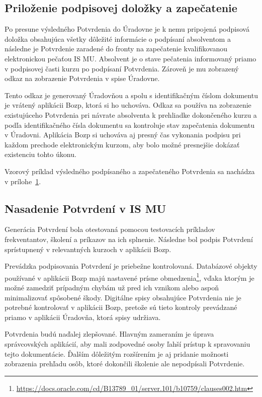 \documentclass[
  digital,     %
  oneside,     %
  nosansbold,  %
  nocolorbold, %
  lof,         %
  nolot,         %
]{fithesis4}
\begin{document}
\subsection*{Priloženie podpisovej doložky a zapečatenie}
Po presune výsledného Potvrdenia do Úradovne je k nemu pripojená podpisová doložka obsahujúca všetky dôležité informácie o podpísaní absolventom a následne je Potvrdenie zaradené do fronty na zapečatenie kvalifikovanou elektronickou pečaťou IS MU. Absolvent je o stave pečatenia informovaný priamo v podpisovej časti kurzu po podpísaní Potvrdenia. Zároveň je mu zobrazený odkaz na zobrazenie Potvrdenia v spise Úradovne.

Tento odkaz je generovaný Úradovňou a spolu s identifikačným číslom dokumentu je vrátený aplikácii Bozp, ktorá si ho uchováva. Odkaz sa používa na zobrazenie existujúceho Potvrdenia pri návrate absolventa k prehliadke dokončeného kurzu a podľa identifikačného čísla dokumentu sa kontroluje stav zapečatenia dokumentu v Úradovni. Aplikácia Bozp si uchováva aj presný čas vykonania podpisu pri každom prechode elektronickým kurzom, aby bolo možné presnejšie dokázať existenciu tohto úkonu.

Vzorový príklad výsledného podpísaného a zapečateného Potvrdenia sa nachádza v prílohe~\hyperref[priloha1]{1}.

\subsection*{Nasadenie Potvrdení v IS MU}
Generácia Potvrdení bola otestovaná pomocou testovacích príkladov frekventantov, školení a príkazov na ich splnenie. Následne bol podpis Potvrdení sprístupnený v relevantných kurzoch v aplikácii Bozp.

Prevádzka podpisovania Potvrdení je priebežne kontrolovaná. Databázové objekty používané v aplikácii Bozp majú nastavené prísne obmedzenia\footnote{\url{https://docs.oracle.com/cd/B13789_01/server.101/b10759/clauses002.htm}}, vďaka ktorým je možné zamedziť prípadným chybám už pred ich vznikom alebo aspoň minimalizovať spôsobené škody. Digitálne spisy obsahujúce Potvrdenia nie je potrebné kontrolovať v aplikácii Bozp, pretože sú tieto kontroly prevádzané priamo v aplikácii Úradovňa, ktorá spisy udržiava.

Potvrdenia budú naďalej zlepšované. Hlavným zameraním je úprava správcovských aplikácií, aby mali zodpovedné osoby ľahší prístup k spravovaniu tejto dokumentácie. Ďalším dôležitým rozšírením je aj pridanie možnosti zobrazenia prehľadu osôb, ktoré dokončili školenie ale nepodpísali Potvrdenie.
\end{document}
